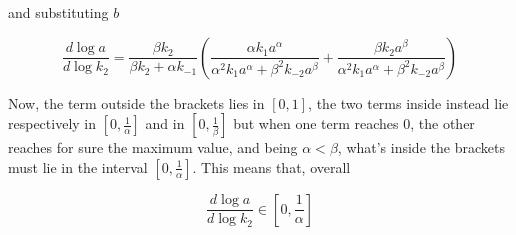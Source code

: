 \documentclass{article}
\begin{document}
	and substituting $b$
	
	\begin{center}
		\begin{equation}
			\frac{d \log a}{d \log k_2} =\frac{\beta k_2}{\beta k_2 + \alpha k_{-1}}\left( \frac{\alpha k_1 a^{\alpha}}{\alpha^2 k_1 a^{\alpha}+\beta^2 k_{-2} a^{\beta}}+\frac{\beta k_2 a^{\beta}}{\alpha^2 k_1 a^{\alpha}+\beta^2 k_{-2} a^{\beta}}\right)
			\label{70}
		\end{equation}
	\end{center}
	
	Now, the term outside the brackets lies in $\left[0,1 \right]$, the two terms inside instead lie respectively in $\left[0,\frac{1}{\alpha}\right]$ and in $\left[0,\frac{1}{\beta}\right]$ but when one term reaches 0, the other reaches for sure the maximum value, and being $\alpha < \beta$, what's inside the brackets must lie in the interval $\left[0, \frac{1}{\alpha} \right]$. This means that, overall 
	
	\begin{center}
		\begin{equation}
			\frac{d \log a}{d \log k_2} \in \left[0, \frac{1}{\alpha} \right]
		\end{equation}
	\end{center}
	

	
\end{document}
